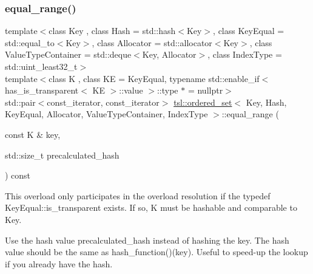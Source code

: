 \subsubsection{\texorpdfstring{equal\_range()}{equal\_range()}\hspace{0.1cm}{\footnotesize\ttfamily [6/6]}}
{\footnotesize\ttfamily template$<$class Key , class Hash  = std\+::hash$<$\+Key$>$, class Key\+Equal  = std\+::equal\+\_\+to$<$\+Key$>$, class Allocator  = std\+::allocator$<$\+Key$>$, class Value\+Type\+Container  = std\+::deque$<$\+Key, Allocator$>$, class Index\+Type  = std\+::uint\+\_\+least32\+\_\+t$>$ \\
template$<$class K , class KE  = Key\+Equal, typename std\+::enable\+\_\+if$<$ has\+\_\+is\+\_\+transparent$<$ K\+E $>$\+::value $>$\+::type $\ast$  = nullptr$>$ \\
std\+::pair$<$const\+\_\+iterator, const\+\_\+iterator$>$ \mbox{\hyperlink{classtsl_1_1ordered__set}{tsl\+::ordered\+\_\+set}}$<$ Key, Hash, Key\+Equal, Allocator, Value\+Type\+Container, Index\+Type $>$\+::equal\+\_\+range (\begin{DoxyParamCaption}\item[{const K \&}]{key,  }\item[{std\+::size\+\_\+t}]{precalculated\+\_\+hash }\end{DoxyParamCaption}) const\hspace{0.3cm}{\ttfamily [inline]}}





This overload only participates in the overload resolution if the typedef Key\+Equal\+::is\+\_\+transparent exists. If so, K must be hashable and comparable to Key.

Use the hash value \textquotesingle{}precalculated\+\_\+hash\textquotesingle{} instead of hashing the key. The hash value should be the same as hash\+\_\+function()(key). Useful to speed-\/up the lookup if you already have the hash. \mbox{\label{classtsl_1_1ordered__set_a91cb7fc84c0bfab1c196109d416bad85}} 
